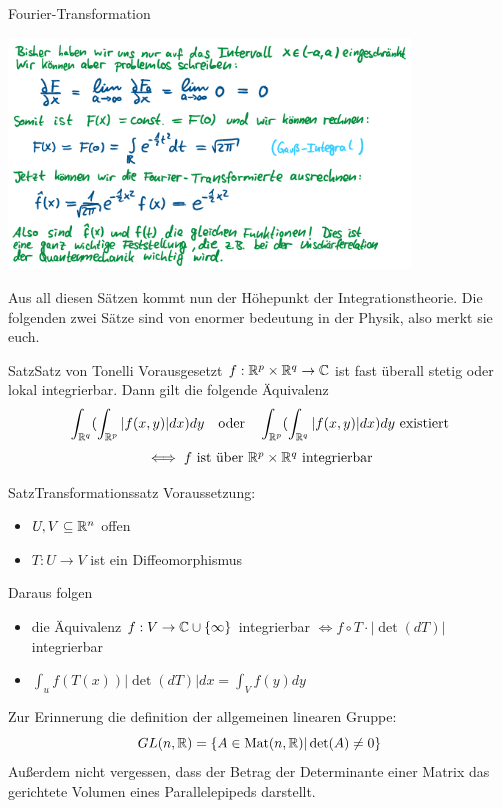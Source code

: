 \begin{Beispiel}{Fourier-Transformation}
\begin{center}
    \includegraphics[width=0.80\textwidth]{Dateien/Fourier_Transform_3.png}
\end{center}
\end{Beispiel}
\newpage
Aus all diesen Sätzen kommt nun der Höhepunkt der Integrationstheorie. Die folgenden zwei Sätze sind von enormer bedeutung in der Physik, also merkt sie euch. 
\begin{Satz}{Satz}{Satz von Tonelli}
    Vorausgesetzt $f:\mathbb{R}^p\times \mathbb{R}^q \rightarrow \mathbb{C}$ ist fast überall stetig oder lokal integrierbar. Dann gilt die folgende Äquivalenz
    $$\int_{\mathbb{R}^q}(\int_{\mathbb{R}^p} |f(x,y)|dx)dy \quad\mbox{oder}\quad\int_{\mathbb{R}^p}(\int_{\mathbb{R}^q} |f(x,y)|dx)dy\mbox{ existiert} $$
    $$\iff \mbox{$f$ ist über $\mathbb{R}^p\times\mathbb{R}^q$ integrierbar}$$
\end{Satz}
\begin{Satz}{Satz}{Transformationssatz}
    Voraussetzung:
    \begin{itemize}
        \item $U,V\subseteq \mathbb{R}^n$ offen
        \item $T: U\rightarrow V$ ist ein Diffeomorphismus
        \end{itemize}
        Daraus folgen
    \begin{itemize}
            \item die Äquivalenz $f:V\rightarrow \mathbb{C}\cup\{\infty\}$ integrierbar $\iff f\circ T\cdot |\det(dT)|$ integrierbar
            \item $\int_u f(T(x))|\det(dT)|dx=\int_V f(y)dy$
        \end{itemize}
    
\end{Satz}
Zur Erinnerung die definition der allgemeinen linearen Gruppe: $$GL(n,\mathbb{R})=\{A\in \mbox{Mat}(n,\mathbb{R})| \det(A)\neq0\}$$
Außerdem nicht vergessen, dass der Betrag der Determinante einer Matrix das gerichtete Volumen eines Parallelepipeds darstellt.
